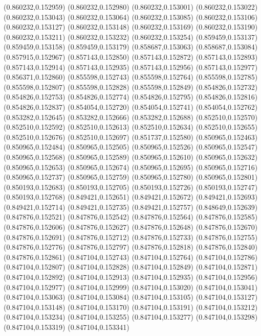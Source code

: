 (0.860232,0.152959)
(0.860232,0.152980)
(0.860232,0.153001)
(0.860232,0.153022)
(0.860232,0.153043)
(0.860232,0.153064)
(0.860232,0.153085)
(0.860232,0.153106)
(0.860232,0.153127)
(0.860232,0.153148)
(0.860232,0.153169)
(0.860232,0.153190)
(0.860232,0.153211)
(0.860232,0.153232)
(0.860232,0.153254)
(0.859459,0.153137)
(0.859459,0.153158)
(0.859459,0.153179)
(0.858687,0.153063)
(0.858687,0.153084)
(0.857915,0.152967)
(0.857143,0.152850)
(0.857143,0.152872)
(0.857143,0.152893)
(0.857143,0.152914)
(0.857143,0.152935)
(0.857143,0.152956)
(0.857143,0.152977)
(0.856371,0.152860)
(0.855598,0.152743)
(0.855598,0.152764)
(0.855598,0.152785)
(0.855598,0.152807)
(0.855598,0.152828)
(0.855598,0.152849)
(0.854826,0.152732)
(0.854826,0.152753)
(0.854826,0.152774)
(0.854826,0.152795)
(0.854826,0.152816)
(0.854826,0.152837)
(0.854054,0.152720)
(0.854054,0.152741)
(0.854054,0.152762)
(0.853282,0.152645)
(0.853282,0.152666)
(0.853282,0.152688)
(0.852510,0.152570)
(0.852510,0.152592)
(0.852510,0.152613)
(0.852510,0.152634)
(0.852510,0.152655)
(0.852510,0.152676)
(0.852510,0.152697)
(0.851737,0.152580)
(0.850965,0.152463)
(0.850965,0.152484)
(0.850965,0.152505)
(0.850965,0.152526)
(0.850965,0.152547)
(0.850965,0.152568)
(0.850965,0.152589)
(0.850965,0.152610)
(0.850965,0.152632)
(0.850965,0.152653)
(0.850965,0.152674)
(0.850965,0.152695)
(0.850965,0.152716)
(0.850965,0.152737)
(0.850965,0.152759)
(0.850965,0.152780)
(0.850965,0.152801)
(0.850193,0.152683)
(0.850193,0.152705)
(0.850193,0.152726)
(0.850193,0.152747)
(0.850193,0.152768)
(0.849421,0.152651)
(0.849421,0.152672)
(0.849421,0.152693)
(0.849421,0.152714)
(0.849421,0.152735)
(0.849421,0.152757)
(0.848649,0.152639)
(0.847876,0.152521)
(0.847876,0.152542)
(0.847876,0.152564)
(0.847876,0.152585)
(0.847876,0.152606)
(0.847876,0.152627)
(0.847876,0.152648)
(0.847876,0.152670)
(0.847876,0.152691)
(0.847876,0.152712)
(0.847876,0.152733)
(0.847876,0.152755)
(0.847876,0.152776)
(0.847876,0.152797)
(0.847876,0.152818)
(0.847876,0.152840)
(0.847876,0.152861)
(0.847104,0.152743)
(0.847104,0.152764)
(0.847104,0.152786)
(0.847104,0.152807)
(0.847104,0.152828)
(0.847104,0.152849)
(0.847104,0.152871)
(0.847104,0.152892)
(0.847104,0.152913)
(0.847104,0.152935)
(0.847104,0.152956)
(0.847104,0.152977)
(0.847104,0.152999)
(0.847104,0.153020)
(0.847104,0.153041)
(0.847104,0.153063)
(0.847104,0.153084)
(0.847104,0.153105)
(0.847104,0.153127)
(0.847104,0.153148)
(0.847104,0.153170)
(0.847104,0.153191)
(0.847104,0.153212)
(0.847104,0.153234)
(0.847104,0.153255)
(0.847104,0.153277)
(0.847104,0.153298)
(0.847104,0.153319)
(0.847104,0.153341)
